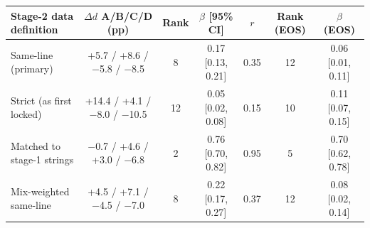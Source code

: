 \begin{tabular}{lccccc c}
\toprule
Stage-2 data definition & $\Delta d$ A/B/C/D (pp) & Rank & $\beta$ [95\% CI] & $r$ & Rank (EOS) & $\beta$ (EOS) \\
\midrule
Same-line (primary) & +5.7 / +8.6 / $-$5.8 / $-$8.5 & 8 & 0.17 [0.13, 0.21] & 0.35 & 12 & 0.06 [0.01, 0.11] \\
Strict (as first locked) & +14.4 / +4.1 / $-$8.0 / $-$10.5 & 12 & 0.05 [0.02, 0.08] & 0.15 & 10 & 0.11 [0.07, 0.15] \\
Matched to stage-1 strings & $-$0.7 / +4.6 / +3.0 / $-$6.8 & 2 & 0.76 [0.70, 0.82] & 0.95 & 5 & 0.70 [0.62, 0.78] \\
Mix-weighted same-line & +4.5 / +7.1 / $-$4.5 / $-$7.0 & 8 & 0.22 [0.17, 0.27] & 0.37 & 12 & 0.08 [0.02, 0.14] \\
\bottomrule
\end{tabular}
